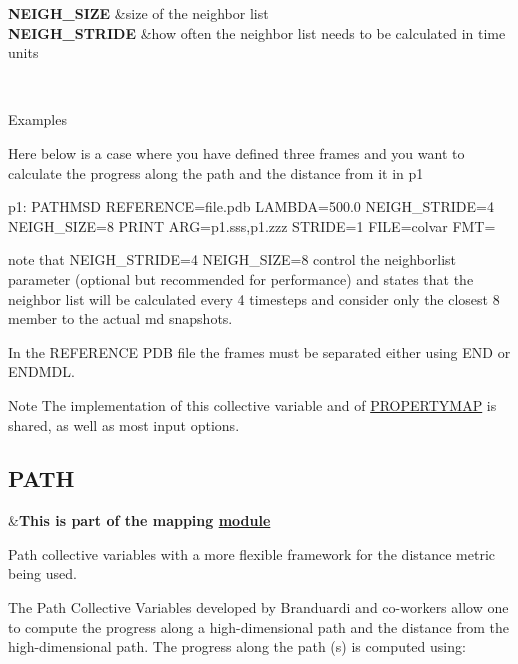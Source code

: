 \begin{TabularC}{2}
\hline
{\bfseries  N\+E\+I\+G\+H\+\_\+\+S\+I\+Z\+E } &size of the neighbor list   \\
{\bfseries  N\+E\+I\+G\+H\+\_\+\+S\+T\+R\+I\+D\+E } &how often the neighbor list needs to be calculated in time units  

\\
\end{TabularC}


\begin{DoxyParagraph}{Examples}

\end{DoxyParagraph}
Here below is a case where you have defined three frames and you want to calculate the progress along the path and the distance from it in p1

\begin{DoxyVerb}p1: PATHMSD REFERENCE=file.pdb  LAMBDA=500.0 NEIGH_STRIDE=4 NEIGH_SIZE=8 
PRINT ARG=p1.sss,p1.zzz STRIDE=1 FILE=colvar FMT=%
\end{DoxyVerb}


note that N\+E\+I\+G\+H\+\_\+\+S\+T\+R\+I\+D\+E=4 N\+E\+I\+G\+H\+\_\+\+S\+I\+Z\+E=8 control the neighborlist parameter (optional but recommended for performance) and states that the neighbor list will be calculated every 4 timesteps and consider only the closest 8 member to the actual md snapshots.

In the R\+E\+F\+E\+R\+E\+N\+C\+E P\+D\+B file the frames must be separated either using E\+N\+D or E\+N\+D\+M\+D\+L.

\begin{DoxyNote}{Note}
The implementation of this collective variable and of \hyperlink{PROPERTYMAP}{P\+R\+O\+P\+E\+R\+T\+Y\+M\+A\+P} is shared, as well as most input options. 
\end{DoxyNote}
\hypertarget{PATH}{}\subsection{P\+A\+T\+H}\label{PATH}
\begin{TabularC}{2}
\hline
&{\bfseries  This is part of the mapping \hyperlink{mymodules}{module }}   \\
\end{TabularC}
Path collective variables with a more flexible framework for the distance metric being used.

The Path Collective Variables developed by Branduardi and co-\/workers \cite{brand07} allow one to compute the progress along a high-\/dimensional path and the distance from the high-\/dimensional path. The progress along the path (s) is computed using\+:

